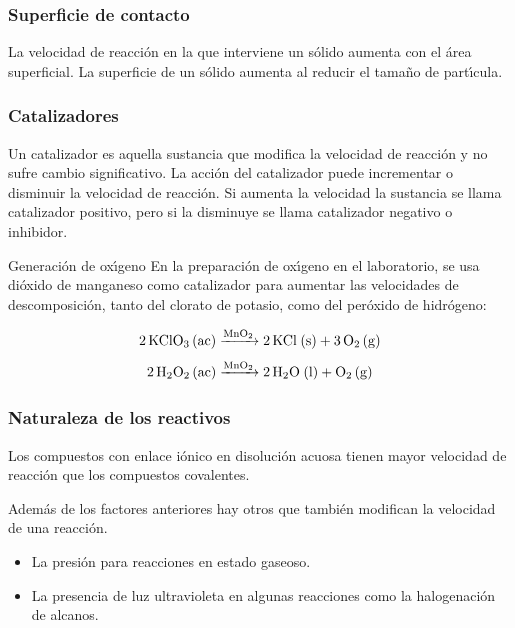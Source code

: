 \subsubsection{Superficie de contacto}
La velocidad de reacci\'on  en la que interviene un s\'olido aumenta con el \'area superficial. La superficie de un s\'olido aumenta al reducir el tama\~no de part\'{\i}cula.
\subsubsection{Catalizadores}
Un \gls{catalizador} es aquella sustancia que modifica la
velocidad de reacci\'on y no sufre cambio significativo. La acci\'on del catalizador puede incrementar o disminuir la velocidad de reacci\'on. Si aumenta la velocidad la sustancia se llama catalizador positivo, pero si la disminuye se llama catalizador negativo o inhibidor.
 
 
\begin{ejemplo}{Generaci\'on de ox\'{\i}geno}
En la preparaci\'on de ox\'{\i}geno en el laboratorio, se usa di\'oxido de manganeso como catalizador para aumentar las velocidades de descomposici\'on, tanto del clorato de potasio, como del per\'oxido de hidr\'ogeno:

$$ \ce{2KClO3 (ac) ->[\ce{MnO2}]  2KCl (s)  + 3O2 (g)} $$
$$\ce{2H2O2 (ac) ->[\ce{MnO2}]  2H2O (l) + O2 (g)} $$
\end{ejemplo}

\subsubsection{Naturaleza de los reactivos}

Los compuestos con enlace i\'onico en disoluci\'on acuosa tienen mayor velocidad de reacci\'on que los compuestos covalentes.

Adem\'as de los factores anteriores hay otros que tambi\'en modifican la velocidad de una reacci\'on.

\begin{itemize}
\item La presi\'on para reacciones en estado  gaseoso.
\item La presencia de luz ultravioleta en algunas reacciones como la halogenaci\'on de alcanos. 
\end{itemize}

